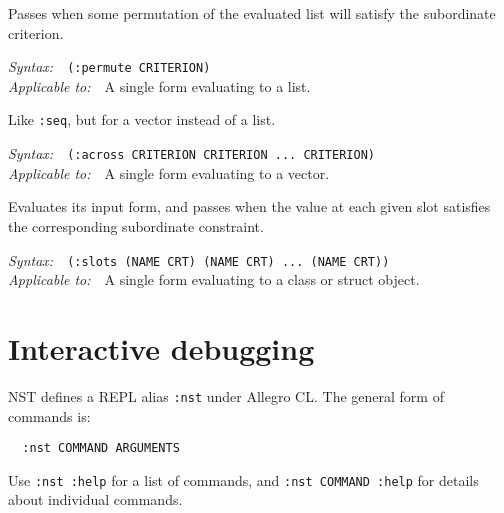 \documentclass{article}
\newenvironment{criteria}%
{\begin{list}{}
    {\setlength{\labelwidth}{0pt}
     \setlength{\leftmargin}{2em}
     \setlength{\rightmargin}{1em}
     \setlength{\itemindent}{0em}}}%
  {\end{list}}
\def\criterion#1#2#3#4{\item[\bfseries #1] #4\par
  \emph{Syntax:}~~\texttt{#2}\\ \emph{Applicable to:}~~#3}
\begin{document}
\begin{criteria}
  \criterion{:permute}{(:permute CRITERION)}{A single form evaluating
    to a list.}{Passes when some permutation of the evaluated list
    will satisfy the subordinate criterion.}

  \criterion{:across}{(:across CRITERION CRITERION ...\ CRITERION)}{A
    single form evaluating to a vector.}{Like \texttt{:seq}, but for a
    vector instead of a list.}

  \criterion{:slots}{\small(:slots (NAME CRT) (NAME CRT) ...\ (NAME
    CRT))}{A single form evaluating to a class or struct
    object.}{Evaluates its input form, and passes when the value at
    each given slot satisfies the corresponding subordinate
    constraint.}
\end{criteria}

\section*{Interactive debugging}
NST defines a REPL alias \texttt{:nst} under Allegro CL.  The general
form of commands is:
\begin{verbatim}
  :nst COMMAND ARGUMENTS
\end{verbatim}
Use \mbox{\texttt{:nst :help}} for a list of commands, and
\mbox{\texttt{:nst COMMAND :help}} for details about individual
commands.
\end{document}
